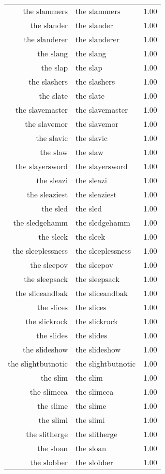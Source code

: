 \begin{table}[ht]
\begin{tabular}{rlr}
  the slammers & the slammers & 1.00 \\ 
  the slander & the slander & 1.00 \\ 
  the slanderer & the slanderer & 1.00 \\ 
  the slang & the slang & 1.00 \\ 
  the slap & the slap & 1.00 \\ 
  the slashers & the slashers & 1.00 \\ 
  the slate & the slate & 1.00 \\ 
  the slavemaster & the slavemaster & 1.00 \\ 
  the slavemor & the slavemor & 1.00 \\ 
  the slavic & the slavic & 1.00 \\ 
  the slaw & the slaw & 1.00 \\ 
  the slayersword & the slayersword & 1.00 \\ 
  the sleazi & the sleazi & 1.00 \\ 
  the sleaziest & the sleaziest & 1.00 \\ 
  the sled & the sled & 1.00 \\ 
  the sledgehamm & the sledgehamm & 1.00 \\ 
  the sleek & the sleek & 1.00 \\ 
  the sleeplessness & the sleeplessness & 1.00 \\ 
  the sleepov & the sleepov & 1.00 \\ 
  the sleepsack & the sleepsack & 1.00 \\ 
  the sliceandbak & the sliceandbak & 1.00 \\ 
  the slices & the slices & 1.00 \\ 
  the slickrock & the slickrock & 1.00 \\ 
  the slides & the slides & 1.00 \\ 
  the slideshow & the slideshow & 1.00 \\ 
  the slightbutnotic & the slightbutnotic & 1.00 \\ 
  the slim & the slim & 1.00 \\ 
  the slimcea & the slimcea & 1.00 \\ 
  the slime & the slime & 1.00 \\ 
  the slimi & the slimi & 1.00 \\ 
  the slitherge & the slitherge & 1.00 \\ 
  the sloan & the sloan & 1.00 \\ 
  the slobber & the slobber & 1.00 \\ 

\end{tabular}
\end{table}
